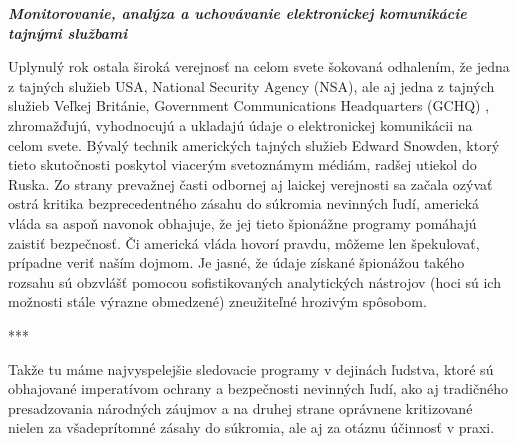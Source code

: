 \documentclass{article}
\begin{document}
\pagebreak
\begin{center}
\Huge
\textbf{\textit{Monitorovanie, analýza a uchovávanie elektronickej komunikácie tajnými službami}}
\normalsize
\end{center}

\bigskip

\setlength{\parindent}{1,25cm}

Uplynulý rok ostala široká verejnosť na celom svete šokovaná odhalením, že jedna z tajných služieb USA, National Security Agency \cite{nsa} (NSA), ale aj jedna z tajných služieb Veľkej Británie, Government Communications Headquarters (GCHQ) \cite{gchq}, zhromažďujú, vyhodnocujú a ukladajú údaje o elektronickej komunikácii na celom svete. Bývalý technik amerických tajných služieb Edward Snowden, ktorý tieto skutočnosti poskytol viacerým svetoznámym médiám, radšej utiekol do Ruska. \cite{techsme1,sme1} Zo strany prevažnej časti odbornej aj laickej verejnosti sa začala ozývať ostrá kritika bezprecedentného zásahu do súkromia nevinných ľudí, americká vláda sa aspoň navonok obhajuje, že jej tieto špionážne programy pomáhajú zaistiť bezpečnosť. Či americká vláda hovorí pravdu, môžeme len špekulovať, prípadne veriť naším dojmom. Je jasné, že údaje získané špionážou takého rozsahu sú obzvlášť pomocou sofistikovaných analytických nástrojov (hoci sú ich možnosti stále výrazne obmedzené) zneužiteľné hrozivým spôsobom.

\begin{center}
***
\end{center}

Takže tu máme najvyspelejšie sledovacie programy v dejinách ľudstva, ktoré sú obhajované imperatívom ochrany a bezpečnosti nevinných ľudí, ako aj tradičného presadzovania národných záujmov a na druhej strane oprávnene kritizované nielen za všadeprítomné zásahy do súkromia, ale aj za otáznu účinnosť v praxi.

\smallskip
\end{document}
